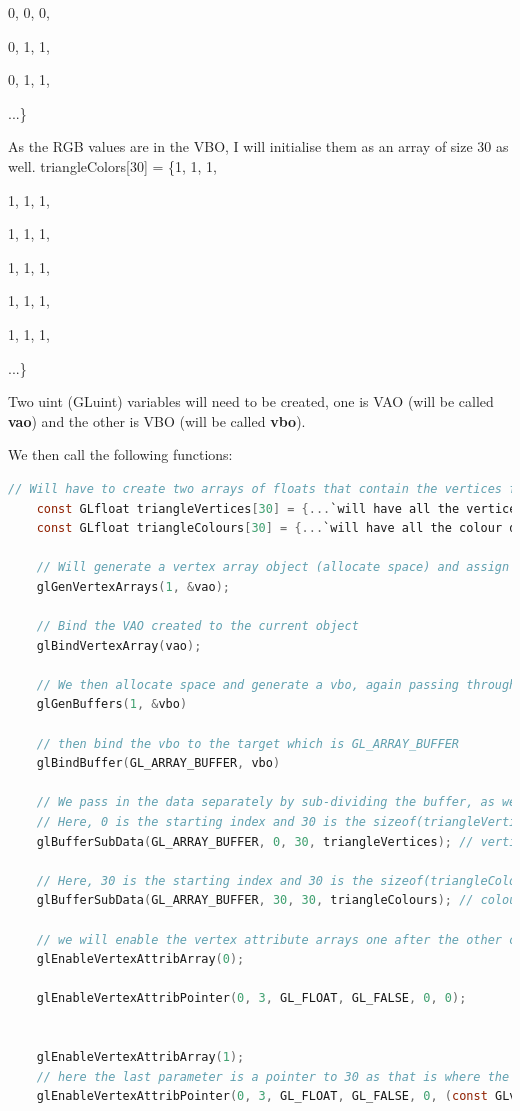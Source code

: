 \documentclass[10pt]{report}
\begin{document}
0, 0, 0,

0, 1, 1,

0, 1, 1,

...\}

As the RGB values are in the VBO, I will initialise them as an array of size 30 as well.
triangleColors[30] = 
\{1, 1, 1,

1, 1, 1,

1, 1, 1,

1, 1, 1,

1, 1, 1,

1, 1, 1, 

...\}

Two uint (GLuint) variables will need to be created, one is VAO (will be called \textbf{vao}) and the other is VBO (will be called \textbf{vbo}).

We then call the following functions:
\begin{lstlisting}[language=c]
    // Will have to create two arrays of floats that contain the vertices for all the triangles and the colours for all the triangles both size 10 
    const GLfloat triangleVertices[30] = {...`will have all the vertices here as floats`...}
    const GLfloat triangleColours[30] = {...`will have all the colour data here as floats`...}

    // Will generate a vertex array object (allocate space) and assign it to vao. We pass through a reference so that it will change the variable.
    glGenVertexArrays(1, &vao);

    // Bind the VAO created to the current object
    glBindVertexArray(vao);

    // We then allocate space and generate a vbo, again passing through a reference
    glGenBuffers(1, &vbo)

    // then bind the vbo to the target which is GL_ARRAY_BUFFER
    glBindBuffer(GL_ARRAY_BUFFER, vbo)

    // We pass in the data separately by sub-dividing the buffer, as we would like to allocate vertices and color to the same buffer. This could be done so that you create two separate buffers and VBOs like seen on https://www.khronos.org/opengl/wiki/Tutorial2:_VAOs,_VBOs,_Vertex_and_Fragment_Shaders_(C_/_SDL)#Compilation
    // Here, 0 is the starting index and 30 is the sizeof(triangleVertices)
    glBufferSubData(GL_ARRAY_BUFFER, 0, 30, triangleVertices); // vertices
    
    // Here, 30 is the starting index and 30 is the sizeof(triangleColours)
    glBufferSubData(GL_ARRAY_BUFFER, 30, 30, triangleColours); // colours

    // we will enable the vertex attribute arrays one after the other creating the correct 
    glEnableVertexAttribArray(0);
    
    glEnableVertexAttribPointer(0, 3, GL_FLOAT, GL_FALSE, 0, 0);
    
    
    glEnableVertexAttribArray(1);
    // here the last parameter is a pointer to 30 as that is where the colour data starts in the buffer
    glEnableVertexAttribPointer(0, 3, GL_FLOAT, GL_FALSE, 0, (const GLvoid*) 30);

    
\end{lstlisting}
\end{document}
